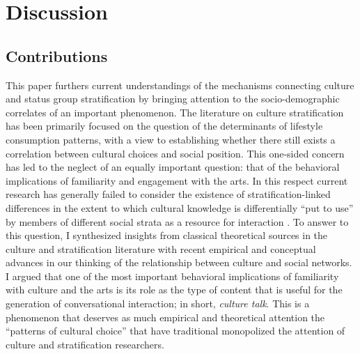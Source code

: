 \section{Discussion}
\label{sec:discussion}
\subsection{Contributions}
This paper furthers current understandings of the mechanisms connecting culture and status group stratification by bringing attention to the socio-demographic correlates of an important phenomenon.  The literature on culture stratification has been primarily focused on the question of the determinants of lifestyle consumption patterns, with a view to establishing whether there still exists a correlation between cultural choices and social position.  This one-sided concern has led to the neglect of an equally important question: that of the behavioral implications of familiarity and engagement with the arts.  In this respect current research has generally failed to consider the existence of stratification-linked differences in the extent to which cultural knowledge is differentially ``put to use'' by members of different social strata as a resource for interaction \citep{dimaggio87, deighton92, gainer95, benzecry_collins14}.  To answer to this question, I synthesized insights from classical theoretical sources in the culture and stratification literature with recent empirical and conceptual advances in our thinking of the relationship between culture and social networks.  I argued that one of the most important behavioral implications of familiarity with culture and the arts is its role as the type of content that is useful for the generation of conversational interaction; in short, \emph{culture talk}.  This is a phenomenon that deserves as much empirical and theoretical attention the ``patterns of cultural choice'' \citep{peterson83} that have traditional monopolized the attention of culture and stratification researchers.   

